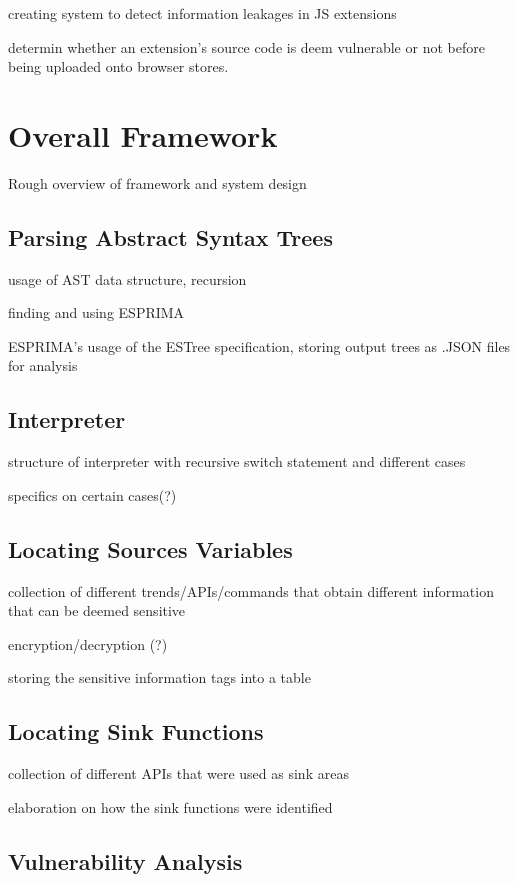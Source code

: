 \documentclass[jou,apacite]{apa6}
\begin{document}
		creating system to detect information leakages in JS extensions	

		determin whether an extension's source code is deem vulnerable or not before being uploaded onto browser stores.



\section{Overall Framework}

Rough overview of framework and system design

	\subsection{Parsing Abstract Syntax Trees}

		usage of AST data structure, recursion

		finding and using ESPRIMA

		ESPRIMA's usage of the ESTree specification, storing output trees as .JSON files for analysis

	\subsection{Interpreter}

		structure of interpreter with recursive switch statement and different cases		

		specifics on certain cases(?)

	\subsection{Locating Sources Variables}

		collection of different trends/APIs/commands that obtain different information that can be deemed sensitive

		encryption/decryption (?)

		storing the sensitive information tags into a table

	\subsection{Locating Sink Functions}

		collection of different APIs that were used as sink areas

		elaboration on how the sink functions were identified

	\subsection{Vulnerability Analysis}
\end{document}
